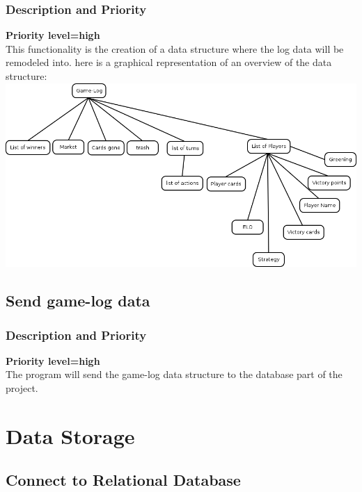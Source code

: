 \documentclass{scrreprt}
\begin{document}
\subsubsection{Description and Priority}
\textbf{Priority level=high}\\
This functionality is the creation of a data structure where the log data will
be remodeled into.
here is a graphical representation of an overview of the data structure:\\
\includegraphics[scale=0.5,keepaspectratio]{game-log}

\subsection{Send game-log data}
\subsubsection{Description and Priority}
\textbf{Priority level=high}\\
The program will send the game-log data structure to the database part of the project.
\section{Data Storage}

\subsection{Connect to Relational Database}
\end{document}
